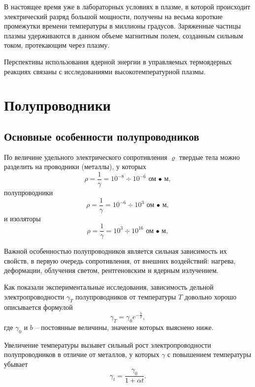 \documentclass[a4paper,10pt]{book}
\begin{document}
В настоящее время уже в лабораторных условиях в плазме, в которой происходит электрический разряд большой мощности, получены на весьма короткие промежутки времени температуры в миллионы градусов. Заряженные частицы плазмы удерживаются в данном объеме магнитным полем, созданным сильным током, протекающим через плазму.

Перспективы использования ядерной энергии в управляемых термоядерных реакциях связаны с исследованиями высокотемпературной плазмы.

\chapter{Полупроводники}
\section{Основные особенности полупроводников}

По величине удельного электрического сопротивления $\varrho$ твердые тела можно разделить на проводники (металлы), у которых\begin{equation*}
\rho = \frac{1}{\gamma} = 10^{-8} \div 10^{-6} \textit{ ом • м},
\end{equation*}
полупроводники\begin{equation*}
\rho = \frac{1}{\gamma} = 10^{-6} \div 10^{3} \textit{ ом • м},
\end{equation*}
и изоляторы
\begin{equation*}
\rho = \frac{1}{\gamma} = 10^{3} \div 10^{16} \textit{ ом • м},
\end{equation*}

Важной особенностью полупроводников является сильная зависимость их свойств, в первую очередь сопротивления, от внешних воздействий: нагрева, деформации, облучения светом, рентгеновским н ядерным излучением.

Как показали экспериментальные исследования, зависимость дельной электропроводности $\gamma_T$ полупроводников от температуры $T$ довольно хорошо описывается формулой\begin{equation}\label{25.1}
\gamma_T = \gamma_0 e^{-\frac{b}{T}},
\end{equation}
где $\gamma_0$ и $b$ -- постоянные величины, значение которых выяснено ниже.

Увеличение температуры вызывет сильный рост электропроводности полупроводников в отличие от металлов, у которых $\gamma$ с повышением температуры убывает\begin{equation*}
\gamma_t = \frac{\gamma_0}{1+\alpha t}.
\end{equation*}
\end{document}
